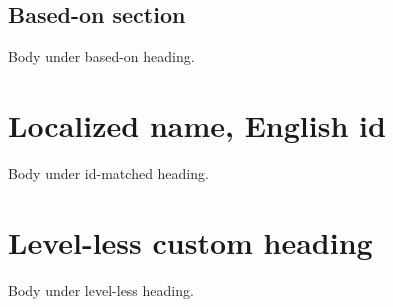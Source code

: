 \documentclass[11pt,a4paper]{article}
\begin{document}
\subsection{Based-on section}

Body under based-on heading.

\section{Localized name, English id}

Body under id-matched heading.

\section{Level-less custom heading}

Body under level-less heading.
\end{document}
